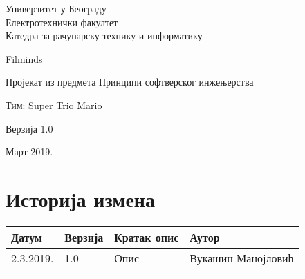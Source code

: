 \documentclass[12pt,a4paper]{article}
\begin{document}
\begin{titlepage}
\begin{center}
    Универзитет у Београду \\
    Електротехнички факултет \\
    Катедра за рачунарску технику и информатику \\
    \vfill

    {\fontsize{50}{60}\selectfont Filminds}
    \vskip 0.6cm

    {\large Пројекат из предмета Принципи софтверског инжењерства }
    \vskip 0.3cm

    {\large Тим: Super Trio Mario}
    \vskip 0.3cm

    {\large Верзија 1.0}

    \vfill
    \vfill

    Март 2019.
    \hfill
\end{center}
\end{titlepage}

\section*{Историја измена}
\noindent
\setcellgapes{4pt}
\makegapedcells
\begin{tabularx}{\linewidth}{|l|l|X|l|}
    \hline
    \textbf{Датум} & \textbf{Верзија} & \textbf{Кратак опис} & \textbf{Аутор} \\
    \hline
    2.3.2019. & 1.0 & Опис & Вукашин Манојловић \\
    \hline
    & & & \\
    \hline
\end{tabularx}
\newpage

\tableofcontents
\newpage











\end{document}

